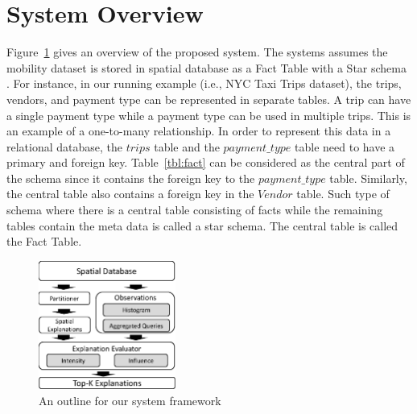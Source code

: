 \section{System Overview}
Figure~\ref{fig:framework} gives an overview of the proposed system. 
The systems assumes the mobility dataset is stored in spatial database as a Fact Table with a Star schema \cite{giovinazzo2000object,adamson2010star}. 
For instance, in our running example (i.e., NYC Taxi Trips dataset), the trips, vendors, and payment type can be represented in separate tables. A trip can have a single payment type while a payment type can be used in multiple trips. This is an example of a one-to-many relationship. 
In order to represent this data in a relational database, the $trips$ table and the $payment\_type$ table need to have a primary and foreign key. Table~\ref{tbl:fact} can be considered as the central part of the schema since it contains the foreign key to the $payment\_type$ table. Similarly, the central table also contains a foreign key in the $Vendor$ table. Such type of schema where there is a central table consisting of facts while the remaining tables contain the meta data is called a star schema. The central table is called the Fact Table. 


\begin{figure}[t]
	\centering
	\includegraphics[width=0.4\textwidth]{images/architecture.eps}
	\caption{An outline for our system framework}
	\label{fig:framework}
\end{figure}




